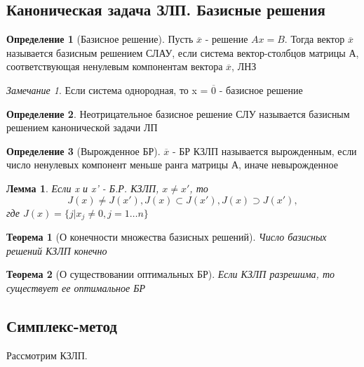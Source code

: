 \documentclass[a4paper]{article}
\newtheorem{theorem}{Теорема}[section]
\newtheorem{lemma}{Лемма}[section]
\theoremstyle{definition}
\newtheorem*{definition}{Определение}
\theoremstyle{remark}
\newtheorem*{remark}{Замечание}
\begin{document}
\subsection{Каноническая задача ЗЛП. Базисные решения}
\begin{definition}[Базисное решение]
    Пусть $\overline{x}$ - решение $Ax = B$. Тогда вектор $\overline{x}$ называется базисным решением СЛАУ, если система вектор-столбцов матрицы А, соответствующая ненулевым компонентам вектора $\overline{x}$, ЛНЗ
\end{definition}
\begin{remark}
    Если система однородная, то x = $\overline{0}$ - базисное решение
\end{remark}
\begin{definition}
    Неотрицательное базисное решение СЛУ называется базисным решением канонической задачи ЛП
\end{definition}
\begin{definition}[Вырожденное БР]
    $\overline{x}$ - БР КЗЛП называется вырожденным, если число ненулевых компонент меньше ранга матрицы А, иначе невырожденное
\end{definition}
\begin{lemma}
    Если x и x' - Б.Р. КЗЛП, $x\neq x'$, то \[J(x) \neq J(x'), J(x)\subset J(x'), J(x) \supset J(x'),\] где $J(x) = \{j | x_j \neq 0, j = 1\dots n\}$
\end{lemma}
\begin{theorem}[О конечности множества базисных решений]
    Число базисных решений КЗЛП конечно
\end{theorem}
\begin{theorem}[О существовании оптимальных БР]
    Если КЗЛП разрешима, то существует ее оптимальное БР
\end{theorem}
\subsection{Симплекс-метод}
Рассмотрим КЗЛП.
\end{document}
